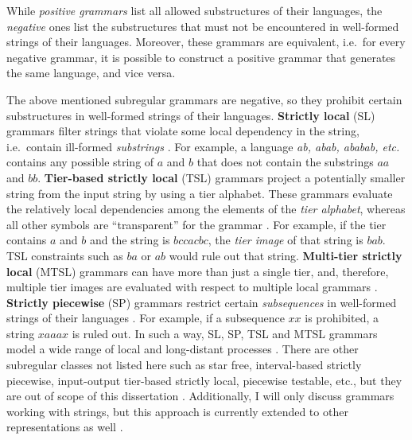 While \emph{positive grammars} list all allowed substructures of their languages, the \emph{negative} ones list the substructures that must not be encountered in well-formed strings of their languages. Moreover, these grammars are equivalent, i.e.\ for every negative grammar, it is possible to construct a positive grammar that generates the same language, and vice versa.

The above mentioned subregular grammars are negative, so they prohibit certain substructures in well-formed strings of their languages.
\textbf{Strictly local} (SL) grammars filter strings that violate some local dependency in the string, i.e.\ contain ill-formed \emph{substrings} \citep{Heinz-2010-SEL}.
For example, a language \emph{ab, abab, ababab, etc.} contains any possible string of $a$ and $b$ that does not contain the substrings $aa$ and $bb$.
\textbf{Tier-based strictly local} (TSL) grammars project a potentially smaller string from the input string by using a tier alphabet.
These grammars evaluate the relatively local dependencies among the elements of the \emph{tier alphabet}, whereas all other symbols are ``transparent'' for the grammar \citep{HeinzRawal11}.
For example, if the tier contains $a$ and $b$ and the string is $bccacbc$, the \emph{tier image} of that string is $bab$.
TSL constraints such as $ba$ or $ab$ would rule out that string.
\textbf{Multi-tier strictly local} (MTSL) grammars can have more than just a single tier, and, therefore, multiple tier images are evaluated with respect to multiple local grammars \citep{DeSantoGraf19FG}.
\textbf{Strictly piecewise} (SP) grammars restrict certain \emph{subsequences} in well-formed strings of their languages \citep{Rogers-HeinzEtAl-2010-LPTSS,Heinz10ldp}.
For example, if a subsequence $xx$ is prohibited, a string $xaaax$ is ruled out.
In such a way, SL, SP, TSL and MTSL grammars model a wide range of local and long-distant processes \citep{Heinz11part1,HeinzRawal11,Heinz-Lai-2013-VHS,AksenovaEtAl16,ChandleeHeinz2018}.
There are other subregular classes not listed here such as star free, interval-based strictly piecewise, input-output tier-based strictly local, piecewise testable, etc., but they are out of scope of this dissertation \citep{Lawson2003,Graf18NELS}.
Additionally, I will only discuss grammars working with strings, but this approach is currently extended to other representations as well \citep{chandlee-etal-2019-learning,chandlee-jardine-2019-autosegmental}.

